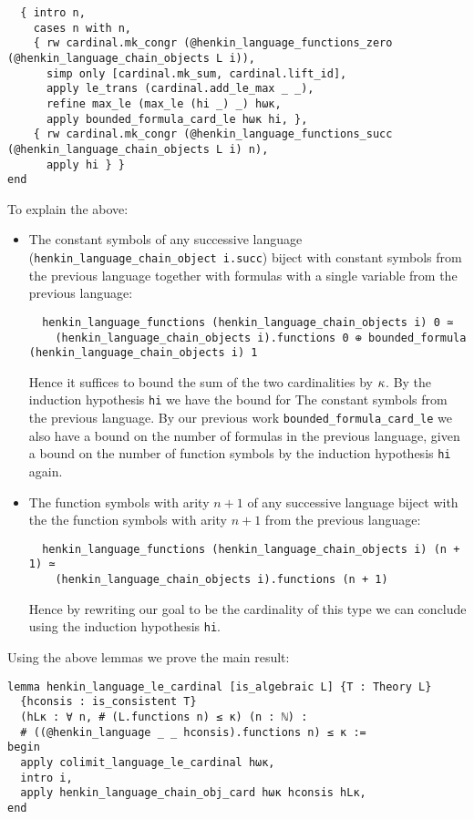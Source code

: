 \begin{lstlisting}
  { intro n,
    cases n with n,
    { rw cardinal.mk_congr (@henkin_language_functions_zero (@henkin_language_chain_objects L i)),
      simp only [cardinal.mk_sum, cardinal.lift_id],
      apply le_trans (cardinal.add_le_max _ _),
      refine max_le (max_le (hi _) _) hωκ,
      apply bounded_formula_card_le hωκ hi, },
    { rw cardinal.mk_congr (@henkin_language_functions_succ (@henkin_language_chain_objects L i) n),
      apply hi } }
end \end{lstlisting}

To explain the above:
\begin{itemize}
  \item The constant symbols of any successive language   (\texttt{henkin\_language\_chain\_object i.succ}) biject with
  constant symbols from the previous language together with
  formulas with a single variable from the previous language:
  \begin{lstlisting}
  henkin_language_functions (henkin_language_chain_objects i) 0 ≃
    (henkin_language_chain_objects i).functions 0 ⊕ bounded_formula (henkin_language_chain_objects i) 1 \end{lstlisting}
  Hence it suffices to bound the sum of the two cardinalities by $\kappa$.
  By the induction hypothesis \texttt{hi} we have the bound for
  The constant symbols from the previous language.
  By our previous work \texttt{bounded\_formula\_card\_le} we also
  have a bound on the number of formulas in the previous language,
  given a bound on the number of function symbols by the induction hypothesis \texttt{hi} again.

  \item The function symbols with arity $n + 1$ of any successive language
        biject with the the function symbols with arity $n + 1$ from the
        previous language:
\begin{lstlisting}
  henkin_language_functions (henkin_language_chain_objects i) (n + 1) ≃
    (henkin_language_chain_objects i).functions (n + 1) \end{lstlisting}
        Hence by rewriting our goal to be the cardinality of this type
        we can conclude using the induction hypothesis \texttt{hi}. \end{itemize}

Using the above lemmas we prove the main result:

\begin{lstlisting}
lemma henkin_language_le_cardinal [is_algebraic L] {T : Theory L}
  {hconsis : is_consistent T}
  (hLκ : ∀ n, # (L.functions n) ≤ κ) (n : ℕ) :
  # ((@henkin_language _ _ hconsis).functions n) ≤ κ :=
begin
  apply colimit_language_le_cardinal hωκ,
  intro i,
  apply henkin_language_chain_obj_card hωκ hconsis hLκ,
end \end{lstlisting}
